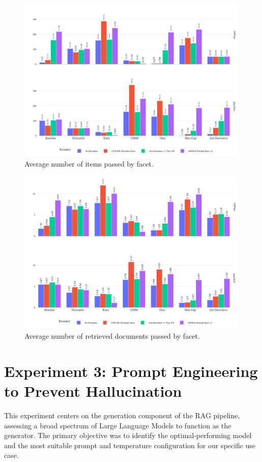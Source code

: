 \begin{figure}[htbp]
  \centering
  \includegraphics[width=0.99\textwidth]{reranker/avg_num_items_passed_bar_faceted.png}
  \caption{\footnotesize Average number of items passed by facet.}
  \label{fig:avg_num_items}
\end{figure}

\begin{figure}[htbp]
  \centering
  \includegraphics[width=0.99\textwidth]{reranker/avg_num_retrieved_docs_passed_bar_faceted.png}
  \caption{\footnotesize Average number of retrieved documents passed by facet.}
  \label{fig:avg_num_docs}
\end{figure}

\section{Experiment 3: Prompt Engineering to Prevent Hallucination}
\label{sec:exp_generator_prompt}
This experiment centers on the generation component of the RAG pipeline, assessing a broad spectrum of Large Language Models to function as the generator. The primary objective was to identify the optimal-performing model and the most suitable prompt and temperature configuration for our specific use case.

